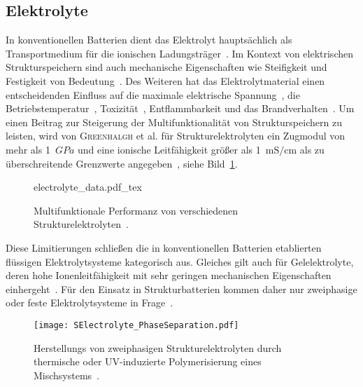 \subsection{Elektrolyte}
In konventionellen Batterien dient das Elektrolyt hauptsächlich als Transportmedium für die ionischen Ladungsträger~\cite{Gerlach2020}. Im Kontext von elektrischen Strukturspeichern sind auch mechanische Eigenschaften wie Steifigkeit und Festigkeit von Bedeutung~\cite{Greenhalgh2023}. Des Weiteren hat das Elektrolytmaterial einen entscheidenden Einfluss auf die maximale elektrische Spannung~\cite{Xu2016}, die Betriebstemperatur~\cite{Chen2022a}, Toxizität~\cite{Beard2019}, Entflammbarkeit und das Brandverhalten~\cite{Roth2012}. Um einen Beitrag zur Steigerung der Multifunktionalität von Strukturspeichern zu leisten, wird von \textsc{Greenhalgh} et al. für Strukturelektrolyten ein Zugmodul von mehr als 1~$\si{GPa}$ und eine ionische Leitfähigkeit größer als 1~$\si{\milli \siemens \per \cm}$ als zu überschreitende Grenzwerte angegeben~\cite{Greenhalgh2023}, siehe Bild~\ref{fig:electrolyte_data}.
\begin{figure}[ht]
        \center
		{electrolyte_data.pdf_tex}
		\caption{\label{fig:electrolyte_data}Multifunktionale Performanz von verschiedenen Strukturelektrolyten~\cite{Greenhalgh2023}.}
\end{figure}
Diese Limitierungen schließen die in konventionellen Batterien etablierten flüssigen Elektrolytsysteme kategorisch aus. Gleiches gilt auch für Gelelektrolyte, deren hohe Ionenleitfähigkeit mit sehr geringen mechanischen Eigenschaften einhergeht~\cite{Gayet2009, Li2018, Zhao2020a}. Für den Einsatz in Strukturbatterien kommen daher nur zweiphasige oder feste Elektrolytsysteme in Frage~\cite{Greenhalgh2023}.

\begin{figure}[!h]
        \center
		\texttt{[image: SElectrolyte\_PhaseSeparation.pdf]}
		\caption{\label{fig:SE_PhaseSepearation}Herstellungs von zweiphasigen Strukturelektrolyten durch thermische oder UV-induzierte Polymerisierung eines Mischsystems~\cite{Schneider2019}.}
\end{figure}

